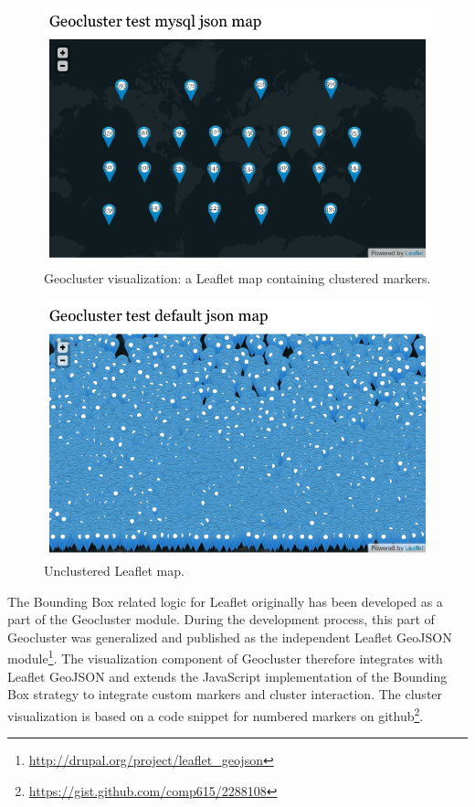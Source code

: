 \begin{figure}[h]
  \begin{center}
    \includegraphics[width=1\textwidth]{figures/map_clustered.png}
    \caption{Geocluster visualization: a Leaflet map containing clustered markers.}
    \label{fig:map-clustered}
  \end{center}
\end{figure}

\begin{figure}[h]
  \begin{center}
    \includegraphics[width=1\textwidth]{figures/map_unclustered.png}
    \caption{Unclustered Leaflet map.}
    \label{fig:map-unclustered}
  \end{center}
\end{figure}


The Bounding Box related logic for Leaflet originally has been developed as a part of the Geocluster module. During the development process, this part of Geocluster was generalized and published as the independent Leaflet GeoJSON module\footnote{\url{http://drupal.org/project/leaflet_geojson}}. The visualization component of Geocluster therefore integrates with Leaflet GeoJSON and extends the JavaScript implementation of the Bounding Box strategy to integrate custom markers and cluster interaction. The cluster visualization is based on a code snippet for numbered markers on github\footnote{\url{https://gist.github.com/comp615/2288108}}.